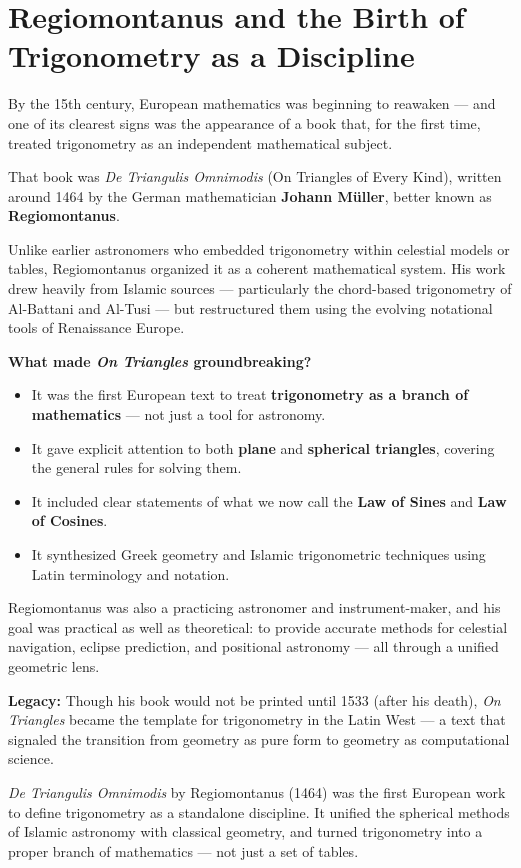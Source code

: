 \section{Regiomontanus and the Birth of Trigonometry as a Discipline}

By the 15th century, European mathematics was beginning to reawaken — and one of its clearest signs was the appearance of a book that, for the first time, treated trigonometry as an independent mathematical subject.

That book was \textit{De Triangulis Omnimodis} (On Triangles of Every Kind), written around 1464 by the German mathematician \textbf{Johann Müller}, better known as \textbf{Regiomontanus}.

Unlike earlier astronomers who embedded trigonometry within celestial models or tables, Regiomontanus organized it as a coherent mathematical system. His work drew heavily from Islamic sources — particularly the chord-based trigonometry of Al-Battani and Al-Tusi — but restructured them using the evolving notational tools of Renaissance Europe.

\textbf{What made \textit{On Triangles} groundbreaking?}

\begin{itemize}
  \item It was the first European text to treat \textbf{trigonometry as a branch of mathematics} — not just a tool for astronomy.
  \item It gave explicit attention to both \textbf{plane} and \textbf{spherical triangles}, covering the general rules for solving them.
  \item It included clear statements of what we now call the \textbf{Law of Sines} and \textbf{Law of Cosines}.
  \item It synthesized Greek geometry and Islamic trigonometric techniques using Latin terminology and notation.
\end{itemize}

Regiomontanus was also a practicing astronomer and instrument-maker, and his goal was practical as well as theoretical: to provide accurate methods for celestial navigation, eclipse prediction, and positional astronomy — all through a unified geometric lens.

\textbf{Legacy:} Though his book would not be printed until 1533 (after his death), \textit{On Triangles} became the template for trigonometry in the Latin West — a text that signaled the transition from geometry as pure form to geometry as computational science.

\begin{tcolorbox}[colback=gray!5!white, colframe=black, title=\textbf{TL;DR: The First Book of Trigonometry}, fonttitle=\bfseries, arc=1.5mm, boxrule=0.4pt]
\textit{De Triangulis Omnimodis} by Regiomontanus (1464) was the first European work to define trigonometry as a standalone discipline.  
It unified the spherical methods of Islamic astronomy with classical geometry, and turned trigonometry into a proper branch of mathematics — not just a set of tables.
\end{tcolorbox}



